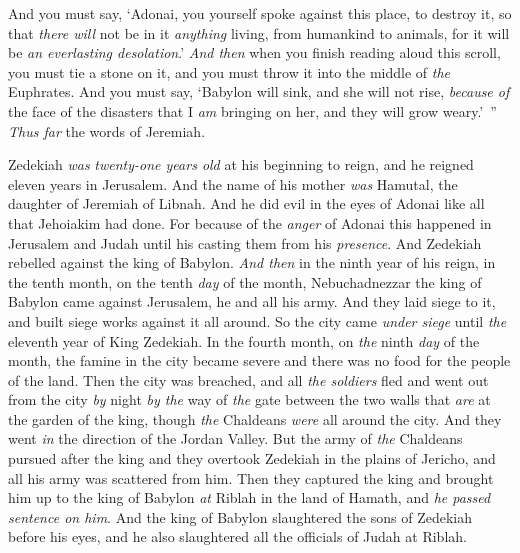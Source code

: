 \begin{biblechapter}
\verse And you must say, ‘Adonai, you yourself spoke against this place, to destroy it, so that \textit{there will} not be in it \textit{anything} living, from humankind to animals, for it will be \textit{an everlasting desolation}.’
\verse \textit{And then} when you finish reading aloud this scroll, you must tie a stone on it, and you must throw it into the middle of \textit{the} Euphrates.
\verse And you must say, ‘Babylon will sink, and she will not rise, \textit{because of} the face of the disasters that I \textit{am} bringing on her, and they will grow weary.’ ” \textit{Thus far} the words of Jeremiah.
\end{biblechapter}

\begin{biblechapter} %
 Zedekiah \textit{was} \textit{twenty-one years old} at his beginning to reign, and he reigned eleven years in Jerusalem. And the name of his mother \textit{was} Hamutal, the daughter of Jeremiah of Libnah.
\verse And he did evil in the eyes of Adonai like all that Jehoiakim had done.
\verse For because of the \textit{anger} of Adonai this happened in Jerusalem and Judah until his casting them from his \textit{presence}. And Zedekiah rebelled against the king of Babylon.
\verse \textit{And then} in the ninth year of his reign, in the tenth month, on the tenth \textit{day} of the month, Nebuchadnezzar the king of Babylon came against Jerusalem, he and all his army. And they laid siege to it, and built siege works against it all around.
\verse So the city came \textit{under siege} until \textit{the} eleventh year of King Zedekiah.
\verse In the fourth month, on \textit{the} ninth \textit{day} of the month, the famine in the city became severe and there was no food for the people of the land.
\verse Then the city was breached, and all \textit{the soldiers} fled and went out from the city \textit{by} night \textit{by the} way of \textit{the} gate between the two walls that \textit{are} at the garden of the king, though \textit{the} Chaldeans \textit{were} all around the city. And they went \textit{in} the direction of the Jordan Valley.
\verse But the army of \textit{the} Chaldeans pursued after the king and they overtook Zedekiah in the plains of Jericho, and all his army was scattered from him.
\verse Then they captured the king and brought him up to the king of Babylon \textit{at} Riblah in the land of Hamath, and \textit{he passed sentence on him}.
\verse And the king of Babylon slaughtered the sons of Zedekiah before his eyes, and he also slaughtered all the officials of Judah at Riblah.

\end{biblechapter}
